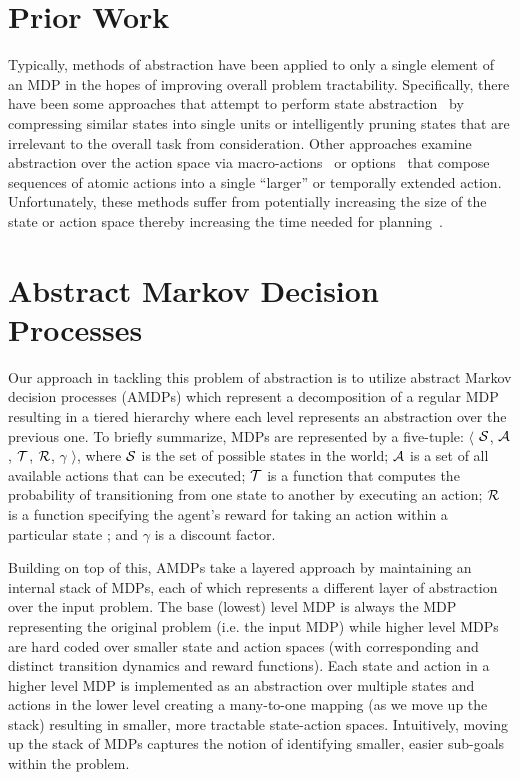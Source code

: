 \documentclass[conference]{IEEEtran}
\begin{document}
\section{Prior Work}
Typically, methods of abstraction have been applied to only a single element of an MDP in the hopes of improving overall problem tractability. Specifically, there have been some approaches that attempt to perform state abstraction~\cite{Li2006TowardsAU} by compressing similar states into single units or intelligently pruning states that are irrelevant to the overall task from consideration. Other approaches examine abstraction over the action space via macro-actions~\cite{Hauskrecht1998HierarchicalSO} or options~\cite{Sutton1999BetweenMA} that compose sequences of atomic actions into a single ``larger'' or temporally extended action. Unfortunately, these methods suffer from potentially increasing the size of the state or action space thereby increasing the time needed for planning~\cite{Jong2008TheUO}.

\section{Abstract Markov Decision Processes}

Our approach in tackling this problem of abstraction is to utilize abstract Markov decision processes (AMDPs) which represent a decomposition of a regular MDP resulting in a tiered hierarchy where each level represents an abstraction over the previous one. To briefly summarize, MDPs are represented by a five-tuple: $\langle$ ${\cal S}$, ${\cal A}$, ${\cal T}$, ${\cal R}$, $\gamma$ $\rangle$, where ${\cal S}$ is the set of possible states in the world; ${\cal A}$ is a set of all available actions that can be executed; ${\cal T}$ is a function that computes the probability of transitioning from one state to another by executing an action; ${\cal R}$ is a function specifying the agent's reward for taking an action within a particular state ; and $\gamma$ is a discount factor.

Building on top of this, AMDPs take a layered approach by maintaining an internal stack of MDPs, each of which represents a different layer of abstraction over the input problem. The base (lowest) level MDP is always the MDP representing the original problem (i.e. the input MDP) while higher level MDPs are hard coded over smaller state and action spaces (with corresponding and distinct transition dynamics and reward functions). Each state and action in a higher level MDP is implemented as an abstraction over multiple states and actions in the lower level creating a many-to-one mapping (as we move up the stack) resulting in smaller, more tractable state-action spaces. Intuitively, moving up the stack of MDPs captures the notion of identifying smaller, easier sub-goals within the problem. 
\end{document}
